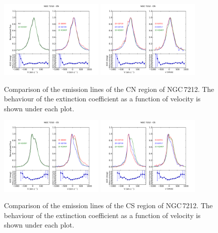\documentclass[../thesis.tex]{subfiles}
\begin{document}
\begin{figure}
\centering
\includegraphics[width=0.45\textwidth]{images/paper1/NGC7212_cn_l1.pdf} \quad
\includegraphics[width=0.45\textwidth]{images/paper1/NGC7212_cn_l2.pdf}\\
\caption[]{Comparison of the emission lines of the CN region of NGC\,7212. The behaviour of the extinction coefficient as a function of velocity is shown under each plot.}
\label{fig:cnl1_N}
\end{figure}

\begin{figure}
\centering
\includegraphics[width=0.45\textwidth]{images/paper1/NGC7212_cs_l1.pdf} \quad
\includegraphics[width=0.45\textwidth]{images/paper1/NGC7212_cs_l2.pdf}\\
\caption[]{Comparison of the emission lines of the CS region of NGC\,7212. The behaviour of the extinction coefficient as a function of velocity is shown under each plot.}
\label{fig:csl1_N}
\end{figure}
\end{document}
